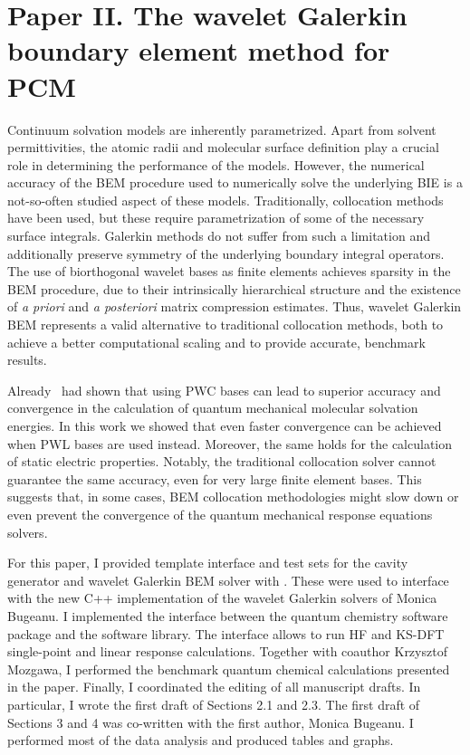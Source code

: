 \section*{Paper II. The wavelet Galerkin boundary element method for PCM}

Continuum solvation models are inherently parametrized. Apart from solvent permittivities,
the atomic radii and molecular surface definition play a crucial role
in determining the performance of the models.
However, the numerical accuracy of the \acs{BEM} procedure used to numerically solve the
underlying \acs{BIE} is a not-so-often studied aspect of these models.
Traditionally, collocation methods have been used, but these require parametrization of some of the necessary surface integrals.
Galerkin methods do not suffer from such a limitation and additionally preserve symmetry of the underlying
boundary integral operators.
The use of biorthogonal wavelet bases as finite elements achieves sparsity in
the \acs{BEM} procedure, due to their intrinsically hierarchical structure and
the existence of \emph{a priori} and \emph{a posteriori} matrix compression
estimates.
Thus, wavelet Galerkin \acs{BEM} represents a valid alternative to traditional
collocation methods, both to achieve a better computational scaling and to
provide accurate, benchmark results.\autocite{Harbrecht2004-uo,
Harbrecht2006-ug, Dahmen2006-pj}

Already~\citeauthor{Weijo2010-hy} had shown that using \ac{PWC} bases can lead
to superior accuracy and convergence in the calculation of quantum mechanical
molecular solvation energies.
In this work we showed that even faster convergence can be achieved when
\ac{PWL} bases are used instead.
Moreover, the same holds for the calculation of static electric properties.
Notably, the traditional collocation solver cannot guarantee the same accuracy,
even for very large finite element bases. This suggests that, in some cases,
\acs{BEM} collocation methodologies might slow down or even prevent the
convergence of the quantum mechanical response equations solvers.

For this paper, I provided template interface and test sets for the cavity
generator\autocite{Harbrecht2009-no, Harbrecht2011-dk} and wavelet Galerkin
\acs{BEM} solver with \pcmsolver.
These were used to interface with the new C++ implementation of the wavelet
Galerkin solvers of Monica Bugeanu.
I implemented the interface between the \LSDALTON quantum chemistry software
package and the \pcmsolver software library. The interface allows to run \acs{HF} and
\acs{KS}-\acs{DFT} single-point and linear response calculations.
Together with coauthor Krzysztof Mozgawa, I performed the benchmark quantum
chemical calculations presented in the paper.
Finally, I coordinated the editing of all manuscript drafts.
In particular, I wrote the first draft of Sections 2.1 and 2.3.
The first draft of Sections 3 and 4 was co-written with the first author, Monica Bugeanu.
I performed most of the data analysis and produced tables and graphs.

